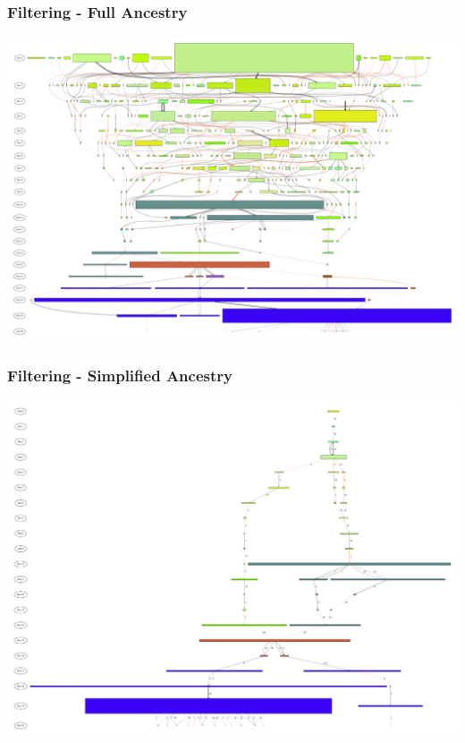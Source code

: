 \documentclass{beamer}
\begin{document}
   \begin{frame}
     \frametitle{Filtering - Full Ancestry}
     \centering
     \includegraphics[width=1\linewidth]{../figures/run0_RBM_color_full_30000}
   \end{frame}
   \begin{frame}
     \frametitle{Filtering - Simplified Ancestry}
     \centering
       \includegraphics[width=1\linewidth]{../figures/run0_RBM_color_filtered_30000}
   \end{frame}

\end{document}
